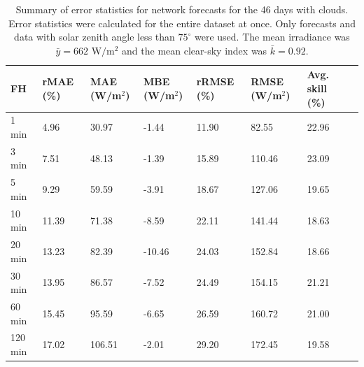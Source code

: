 \begin{table}
\centering
\caption{Summary of error statistics for network forecasts for the 46 days with clouds. Error statistics were calculated for the entire dataset at once. Only forecasts and data with solar zenith angle less than $75^\circ$ were used. The mean irradiance was $\bar{y} = 662 \mbox{ W/m$^2$}$ and the mean clear-sky index was $\bar{k} = 0.92$.}
\begin{tabular}{llllllll}
\toprule
FH &  rMAE (\%) &  MAE (W/m$^2$) &  MBE (W/m$^2$) &  rRMSE (\%) &  RMSE (W/m$^2$) &  Avg. skill (\%) \\
\midrule
 1 min  &      4.96 &          30.97 &          -1.44 &      11.90 &           82.55 &           22.96 \\
 3 min  &      7.51 &          48.13 &          -1.39 &      15.89 &          110.46 &           23.09 \\
 5 min  &      9.29 &          59.59 &          -3.91 &      18.67 &          127.06 &           19.65 \\
10 min  &     11.39 &          71.38 &          -8.59 &      22.11 &          141.44 &           18.63 \\
20 min  &     13.23 &          82.39 &         -10.46 &      24.03 &          152.84 &           18.66 \\
30 min  &     13.95 &          86.57 &          -7.52 &      24.49 &          154.15 &           21.21 \\
60 min  &     15.45 &          95.59 &          -6.65 &      26.59 &          160.72 &           21.00 \\
120 min &     17.02 &         106.51 &          -2.01 &      29.20 &          172.45 &           19.58 \\
\bottomrule
\end{tabular}
\label{table:network_errors}
\end{table}

